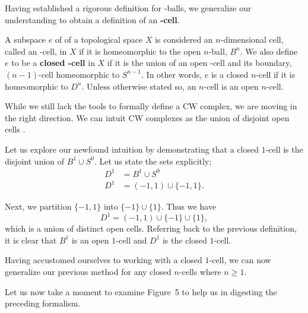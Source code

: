 Having established a rigorous definition for \n-balls, we generalize our understanding to obtain a definition of an \textbf{\n-cell}.

\begin{defn}
A subspace $e$ of of a topological space $X$ is considered an $n$-dimensional cell, called an \n-cell, in $X$ if it is homeomorphic to the open $n$-ball, $B^n$. We also define $e$ to be a \textbf{closed \n-cell} in $X$ if it is the union of an open \n-cell and its boundary, $(n-1)$-cell homeomorphic to $S^{n-1}$. In other words, $e$ is a closed $n$-cell if it is homeomorphic to $D^n$. Unless otherwise stated so, an $n$-cell is an open $n$-cell. 
\end{defn}

While we still lack the tools to formally define a CW complex, we are moving in the right direction. We can intuit CW complexes as the union of disjoint open cells \cite{cw}.

Let us explore our newfound intuition by demonstrating that a closed $1$-cell is the disjoint union of $B^1 \cup S^0$. Let us state the sets explicitly;
\begin{align*}
D^1 &= B^1 \cup S^0\\
D^1 &= (-1,1) \cup \{-1,1\}.
\end{align*}

Next, we partition $\{-1,1\}$ into $\{-1\}\cup\{1\}$. Thus we have $$D^1 = (-1,1) \cup \{-1\}\cup\{1\},$$ which is a union of distinct open cells. Referring back to the previous definition, it is clear that $B^1$ is an open $1$-cell and $D^1$ is the closed $1$-cell.

Having accustomed ourselves to working with a closed $1$-cell, we can now generalize our previous method for any closed $n$-cells where $n\geq 1$.

Let us now take a moment to examine Figure~5 to help us in digesting the preceding formalism.

